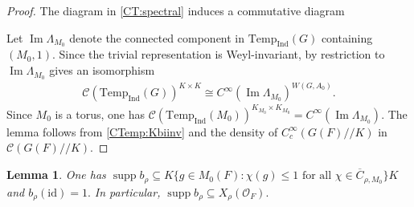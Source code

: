 \documentclass[10pt]{amsart}
\newtheorem{lemma}[theorem]{Lemma}
\theoremstyle{definition}
\numberwithin{equation}{section}
\DeclareMathOperator{\supp}{\mathrm{supp}}
\numberwithin{equation}{subsection}
\newcommand{\Ind}{\mathrm{Ind}}
\newcommand{\Temp}{\mathrm{Temp}}
\renewcommand{\Im}{\mathop{\mathrm{Im}}}
\newcommand{\HP}{\mathop{\mathrm{HP}}\nolimits}
\begin{document}
\begin{proof} The diagram in \eqref{CT:spectral} induces a commutative diagram
\begin{center}
\end{center}
Let $\Im\Lambda_{M_0}$ denote the connected component in $\Temp_\Ind(G)$ containing $(M_0,1)$. Since the trivial representation is Weyl-invariant, by \cite[Lemma 4.11]{DRS} restriction to $\Im\Lambda_{M_0}$ gives an isomorphism 
\begin{align}\label{CTemp:Kbiinv}
    \mathcal{C}(\Temp_{\Ind}(G))^{K\times K} \cong C^\infty(\Im\Lambda_{M_0})^{W(G,A_0)}.
\end{align}
Since $M_0$ is a torus, one has $\mathcal{C}(\Temp_\Ind(M_0))^{K_{M_0}\times K_{M_0}} = C^\infty(\Im\Lambda_{M_0})$. The lemma follows from \eqref{CTemp:Kbiinv} and the density of $C_c^\infty(G(F)/\!/K)$ in $\mathcal{C}(G(F)/\!/K)$.
\end{proof}


\begin{lemma}
    One has $\supp b_\rho \subseteq K\{g\in M_0(F): \chi(g)\leq 1 \text{ for all }\chi\in \overline{C}_{\rho,M_0}\}K$ and $b_\rho(\mathrm{id})=1.$ In particular, $\supp b_\rho\subseteq X_\rho(\mathcal{O}_F).$
\end{lemma}
\end{document}
